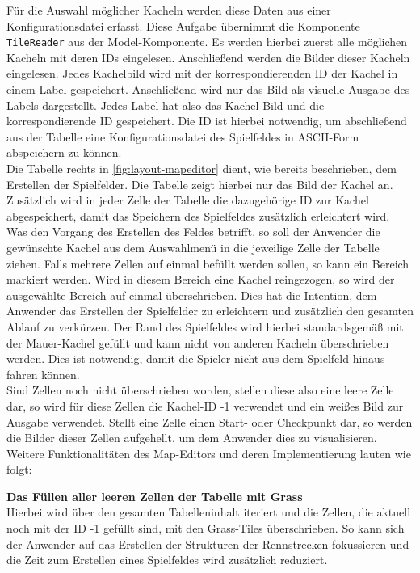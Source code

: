 Für die Auswahl möglicher Kacheln werden diese Daten aus einer Konfigurationsdatei erfasst. Diese Aufgabe übernimmt die Komponente \texttt{TileReader} aus der Model-Komponente. Es werden hierbei zuerst alle möglichen Kacheln mit deren IDs eingelesen. Anschließend werden die Bilder dieser Kacheln eingelesen. Jedes Kachelbild wird mit der korrespondierenden ID der Kachel in einem Label gespeichert. Anschließend wird nur das Bild als visuelle Ausgabe des Labels dargestellt. Jedes Label hat also das Kachel-Bild und die korrespondierende ID gespeichert. Die ID ist hierbei notwendig, um abschließend aus der Tabelle eine Konfigurationsdatei des Spielfeldes in ASCII-Form abspeichern zu können.\\
Die Tabelle rechts in \autoref{fig:layout-mapeditor} dient, wie bereits beschrieben, dem Erstellen der Spielfelder. Die Tabelle zeigt hierbei nur das Bild der Kachel an. Zusätzlich wird in jeder Zelle der Tabelle die dazugehörige ID zur Kachel abgespeichert, damit das Speichern des Spielfeldes zusätzlich erleichtert wird.\\
Was den Vorgang des Erstellen des Feldes betrifft, so soll der Anwender die gewünschte Kachel aus dem Auswahlmenü in die jeweilige Zelle der Tabelle ziehen. Falls mehrere Zellen auf einmal befüllt werden sollen, so kann ein Bereich markiert werden. Wird in diesem Bereich eine Kachel reingezogen, so wird der ausgewählte Bereich auf einmal überschrieben. Dies hat die Intention, dem Anwender das Erstellen der Spielfelder zu erleichtern und zusätzlich den gesamten Ablauf zu verkürzen. Der Rand des Spielfeldes wird hierbei standardsgemäß mit der Mauer-Kachel gefüllt und kann nicht von anderen Kacheln überschrieben werden. Dies ist notwendig, damit die Spieler nicht aus dem Spielfeld hinaus fahren können.\\
Sind Zellen noch nicht überschrieben worden, stellen diese also eine leere Zelle dar, so wird für diese Zellen die Kachel-ID -1 verwendet und ein weißes Bild zur Ausgabe verwendet. Stellt eine Zelle einen Start- oder Checkpunkt dar, so werden die Bilder dieser Zellen aufgehellt, um dem Anwender dies zu visualisieren.\\
Weitere Funktionalitäten des Map-Editors und deren Implementierung lauten wie folgt:

\textbf{Das Füllen aller leeren Zellen der Tabelle mit Grass}\\
Hierbei wird über den gesamten Tabelleninhalt iteriert und die Zellen, die aktuell noch mit der ID -1 gefüllt sind, mit den Grass-Tiles überschrieben. So kann sich der Anwender auf das Erstellen der Strukturen der Rennstrecken fokussieren und die Zeit zum Erstellen eines Spielfeldes wird zusätzlich reduziert.

